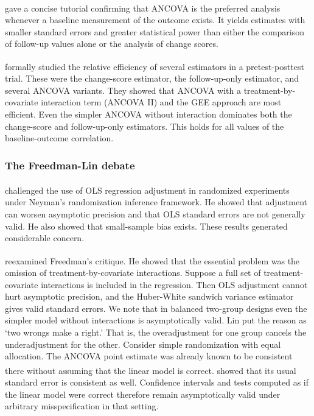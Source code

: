 \documentclass[
  11pt,
]{article}
\begin{document}
\textsuperscript{} gave a concise tutorial confirming
that ANCOVA is the preferred analysis whenever a
baseline measurement of the outcome exists. It
yields estimates with smaller standard errors and
greater statistical power than either the comparison of
follow-up values alone or the analysis of change scores.

\textsuperscript{} formally studied the relative
efficiency of several estimators in a pretest-posttest
trial. These were the change-score estimator, the
follow-up-only estimator, and several ANCOVA variants.
They showed that ANCOVA with a treatment-by-covariate
interaction term (ANCOVA II) and the GEE approach are
most efficient. Even
the simpler ANCOVA without interaction dominates both
the change-score and follow-up-only estimators. This
holds for all values of the baseline-outcome
correlation.

\subsubsection{The Freedman-Lin debate}\label{the-freedman-lin-debate}

\textsuperscript{} challenged the use of OLS
regression adjustment in randomized experiments under
Neyman's randomization inference framework. He showed that adjustment can worsen
asymptotic precision and that OLS standard errors are
not generally valid. He also showed that small-sample
bias exists. These results generated considerable
concern.

\textsuperscript{} reexamined Freedman's critique. He
showed that the essential problem was the omission of
treatment-by-covariate interactions. Suppose a full set
of treatment-covariate interactions is included in the
regression. Then OLS adjustment cannot hurt asymptotic
precision, and the Huber-White sandwich variance
estimator gives valid standard errors. We note that in
balanced two-group designs even the simpler model
without interactions is asymptotically valid. Lin put
the reason as `two wrongs make a right.' That is, the
overadjustment for one group cancels the
underadjustment for the other.
Consider simple randomization with equal allocation.
The ANCOVA point estimate was already known to be
consistent there without assuming that the linear model
is correct\textsuperscript{}.\textsuperscript{}
showed that its usual standard error is consistent as
well. Confidence
intervals and tests computed as if the linear model
were correct therefore remain asymptotically valid
under arbitrary misspecification in that setting.
\end{document}
